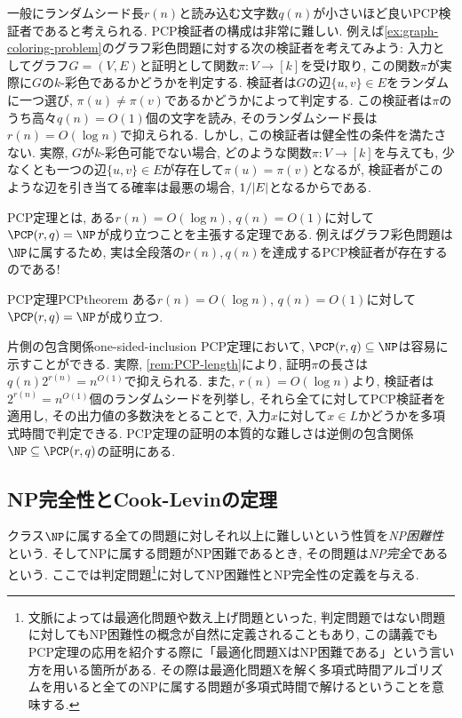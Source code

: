 一般にランダムシード長$r(n)$と読み込む文字数$q(n)$が小さいほど良いPCP検証者であると考えられる.
PCP検証者の構成は非常に難しい.
例えば\cref{ex:graph-coloring-problem}のグラフ彩色問題に対する次の検証者を考えてみよう:
入力としてグラフ$G=(V,E)$と証明として関数$\pi\colon V\to[k]$を受け取り, この関数$\pi$が実際に$G$の$k$-彩色であるかどうかを判定する.
検証者は$G$の辺$\{u,v\}\in E$をランダムに一つ選び, $\pi(u)\neq \pi(v)$であるかどうかによって判定する.
この検証者は$\pi$のうち高々$q(n)=O(1)$個の文字を読み, そのランダムシード長は$r(n)=O(\log n)$で抑えられる.
しかし, この検証者は健全性の条件を満たさない.
実際, $G$が$k$-彩色可能でない場合, どのような関数$\pi\colon V \to [k]$を与えても, 少なくとも一つの辺$\{u,v\}\in E$が存在して$\pi(u)=\pi(v)$となるが, 検証者がこのような辺を引き当てる確率は最悪の場合, $1/\abs{E}$となるからである.

PCP定理とは, ある$r(n)=O(\log n)$, $q(n)=O(1)$に対して$\PCP(r,q)=\NP$が成り立つことを主張する定理である.
例えばグラフ彩色問題は$\NP$に属するため, 実は全段落の$r(n),q(n)$を達成するPCP検証者が存在するのである!

\begin{theorem}{PCP定理}{PCPtheorem}
  ある$r(n)=O(\log n)$, $q(n)=O(1)$に対して$\PCP(r,q)=\NP$が成り立つ.
\end{theorem}

\begin{remark}{片側の包含関係}{one-sided-inclusion}
  PCP定理において, $\PCP(r,q)\subseteq \NP$は容易に示すことができる.
  実際, \cref{rem:PCP-length}により, 証明$\pi$の長さは$q(n)2^{r(n)} = n^{O(1)}$で抑えられる.
  また, $r(n)=O(\log n)$より, 検証者は$2^{r(n)}=n^{O(1)}$個のランダムシードを列挙し, それら全てに対してPCP検証者を適用し, その出力値の多数決をとることで, 入力$x$に対して$x\in L$かどうかを多項式時間で判定できる.
  PCP定理の証明の本質的な難しさは逆側の包含関係$\NP\subseteq \PCP(r,q)$の証明にある.
\end{remark}

\subsection{NP完全性とCook-Levinの定理}

クラス$\NP$に属する全ての問題に対しそれ以上に難しいという性質を\emph{NP困難性}という.
そしてNPに属する問題がNP困難であるとき, その問題は\emph{NP完全}であるという.
ここでは判定問題\footnote{文脈によっては最適化問題や数え上げ問題といった, 判定問題ではない問題に対してもNP困難性の概念が自然に定義されることもあり, この講義でもPCP定理の応用を紹介する際に「最適化問題XはNP困難である」という言い方を用いる箇所がある. その際は最適化問題Xを解く多項式時間アルゴリズムを用いると全てのNPに属する問題が多項式時間で解けるということを意味する.}に対してNP困難性とNP完全性の定義を与える.

